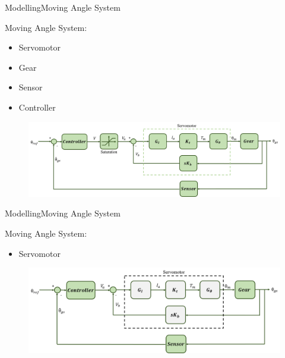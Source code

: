 
%
%
%  
%
%
%
%

\begin{frame}{Modelling}{Moving Angle System}
  \begin{block}{Moving Angle System:}

	  \begin{itemize}
  	  	\item Servomotor
	  	\item Gear
	  	\item Sensor
	  	\item Controller
	  \end{itemize}

	  \begin{figure}
        \includegraphics[scale=0.26]{../report/figures/complete_model.png}
      \end{figure}
  
  \end{block}
\end{frame}


\begin{frame}{Modelling}{Moving Angle System}
  \begin{block}{Moving Angle System:}

	  \begin{itemize}
	  	\item Servomotor
	  \end{itemize}

	  \begin{figure}
        \includegraphics[scale=0.26]{../report/figures/servo+gear+noise+servomotor.png}
      \end{figure}
  
  \end{block}
\end{frame}

